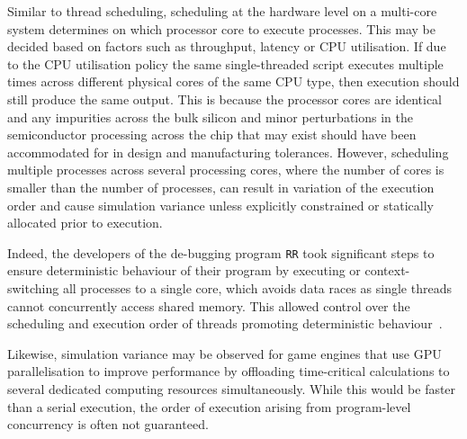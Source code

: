 \documentclass[letterpaper, 10 pt, journal, twoside]{IEEEtran}
\begin{document}
Similar to thread scheduling, scheduling at the hardware level on a multi-core system determines on which processor core to execute processes. This may be decided based on factors such as throughput, latency or CPU utilisation. 
%
If due to the CPU utilisation policy the same single-threaded script executes multiple times across different physical cores of the same CPU type,  then execution should still produce the same output. 
%
This is because the processor cores are identical and any impurities across the bulk silicon and minor perturbations in the semiconductor processing across the chip that may exist should have been accommodated for in design and manufacturing tolerances.
%
However, scheduling multiple processes across several processing cores, where the number of cores is smaller than the number of processes, can result in variation of the execution order and cause simulation variance unless explicitly constrained or statically allocated prior to execution. 

Indeed, the developers of the de-bugging program \texttt{RR} took significant steps to ensure deterministic behaviour of their program by executing or context-switching all processes to a single core, which avoids data races as single threads cannot concurrently access shared memory. This allowed control over the scheduling and execution order of threads promoting deterministic behaviour~\cite{acm-q-rr-interview}.
%

Likewise, simulation variance may be observed for game engines that use GPU parallelisation to improve performance by offloading time-critical calculations to several dedicated computing resources simultaneously. While this would be faster than a serial execution, the order of execution arising from program-level concurrency is often not guaranteed. 
\end{document}

